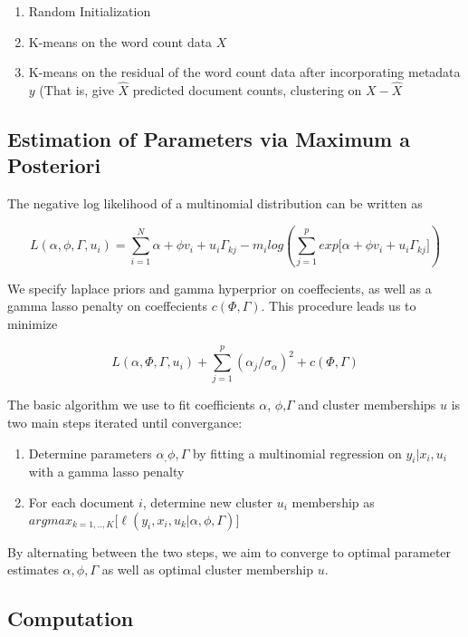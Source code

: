 \documentclass[12pt]{article}
\begin{document}
\begin{enumerate}
\def\labelenumi{\arabic{enumi}.}
\itemsep1pt\parskip0pt
\item
  Random Initialization
\item
  K-means on the word count data $X$
\item
  K-means on the residual of the word count data after incorporating
  metadata $y$ (That is, give $\hat{X}$ predicted document counts,
  clustering on $X-\hat{X}$
\end{enumerate}

\subsection{Estimation of Parameters via Maximum a
Posteriori}\label{estimation-of-parameters-via-maximum-a-posteriori}

The negative log likelihood of a multinomial distribution can be written
as

\[L(\alpha,\phi,\Gamma,u_i) = \sum_{i = 1}^{N}{\alpha + \phi v_i + u_i \Gamma_{kj}} - m_i log(\sum_{j = 1}^{p}{exp{\big[ \alpha + \phi v_i + u_i \Gamma_{kj} \big]}})\]

We specify laplace priors and gamma hyperprior on coeffecients, as well
as a gamma lasso penalty on coeffecients $c(\Phi,\Gamma)$. This
procedure leads us to minimize

\[L(\alpha,\Phi,\Gamma,u_i) + \sum_{j=1}^{p}(\alpha_j/ \sigma_\alpha)^2 + c(\Phi,\Gamma) \]

The basic algorithm we use to fit coefficients $\alpha$, $\phi$,$\Gamma$
and cluster memberships $u$ is two main steps iterated until
convergance:

\begin{enumerate}
\def\labelenumi{\arabic{enumi}.}
\item
  Determine parameters $\alpha_, \phi, \Gamma$ by fitting a multinomial
  regression on $y_i | x_i , u_i$ with a gamma lasso penalty
\item
  For each document $i$, determine new cluster $u_i$ membership as
  $argmax_{k = 1,..,K} \big[  \ell(y_i,x_i,u_k | \alpha, \phi, \Gamma) \big]$
\end{enumerate}

By alternating between the two steps, we aim to converge to optimal
parameter estimates $\alpha, \phi, \Gamma$ as well as optimal cluster
membership $u$.

\subsection{Computation}\label{computation}
\end{document}
